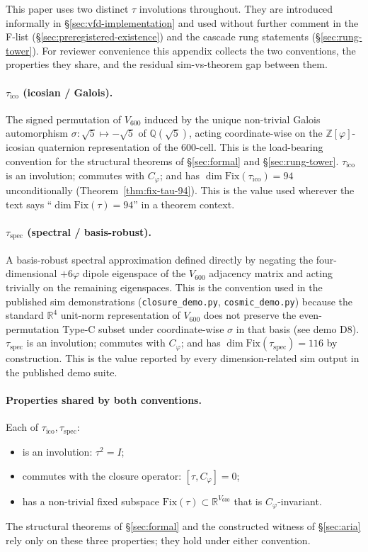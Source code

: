\documentclass[11pt]{article}
\theoremstyle{plain}
\theoremstyle{definition}
\theoremstyle{remark}
\begin{document}
This paper uses two distinct $\tau$ involutions throughout. They are
introduced informally in \S\ref{sec:vfd-implementation} and used
without further comment in the F-list (\S\ref{sec:preregistered-existence})
and the cascade rung statements (\S\ref{sec:rung-tower}). For
reviewer convenience this appendix collects the two conventions, the
properties they share, and the residual sim-vs-theorem gap between them.

\paragraph{$\tau_{\mathrm{ico}}$ (icosian / Galois).} The signed
permutation of $V_{600}$ induced by the unique non-trivial Galois
automorphism $\sigma: \sqrt{5} \mapsto -\sqrt{5}$ of $\mathbb{Q}(\sqrt{5})$,
acting coordinate-wise on the $\mathbb{Z}[\varphi]$-icosian quaternion
representation of the 600-cell. This is the load-bearing convention for
the structural theorems of \S\ref{sec:formal} and \S\ref{sec:rung-tower}.
$\tau_{\mathrm{ico}}$ is an involution; commutes with $C_\varphi$;
and has $\dim \mathrm{Fix}(\tau_{\mathrm{ico}}) = 94$ unconditionally
(Theorem~\ref{thm:fix-tau-94}). This is the value used wherever the
text says ``$\dim \mathrm{Fix}(\tau) = 94$'' in a theorem context.

\paragraph{$\tau_{\mathrm{spec}}$ (spectral / basis-robust).} A basis-robust
spectral approximation defined directly by negating the four-dimensional
$+6\varphi$ dipole eigenspace of the $V_{600}$ adjacency matrix and
acting trivially on the remaining eigenspaces. This is the convention
used in the published sim demonstrations (\texttt{closure\_demo.py},
\texttt{cosmic\_demo.py}) because the standard $\mathbb{R}^4$ unit-norm
representation of $V_{600}$ does not preserve the even-permutation
Type-C subset under coordinate-wise $\sigma$ in that basis
(see demo D8). $\tau_{\mathrm{spec}}$ is an involution; commutes with
$C_\varphi$; and has $\dim \mathrm{Fix}(\tau_{\mathrm{spec}}) = 116$
by construction. This is the value reported by every dimension-related
sim output in the published demo suite.

\paragraph{Properties shared by both conventions.} Each of $\tau_{\mathrm{ico}}, \tau_{\mathrm{spec}}$:
\begin{itemize}[leftmargin=2em]
\item is an involution: $\tau^2 = I$;
\item commutes with the closure operator: $[\tau, C_\varphi] = 0$;
\item has a non-trivial fixed subspace $\mathrm{Fix}(\tau) \subset \mathbb{R}^{V_{600}}$ that is $C_\varphi$-invariant.
\end{itemize}
The structural theorems of \S\ref{sec:formal} and the constructed
witness of \S\ref{sec:aria} rely only on these three properties; they
hold under either convention.
\end{document}
